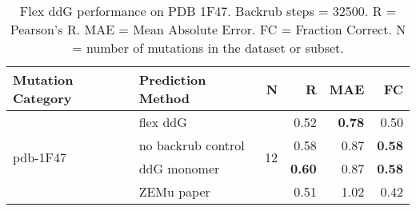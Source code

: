 \begin{table}
  \begin{tabular}{llrrrr}
\toprule
Mutation Category &   Prediction Method &   N &    R &  MAE &   FC \\
\midrule
 \multirow{ 4}{*}{pdb-1F47} & flex ddG & \multirow{ 4}{*}{12} & 0.52 & \textbf{0.78} & 0.50  \\
 & no backrub control & & 0.58 & 0.87 & \textbf{0.58}  \\
 & ddG monomer & & \textbf{0.60} & 0.87 & \textbf{0.58}  \\
 & ZEMu paper & & 0.51 & 1.02 & 0.42  \\
\bottomrule
\end{tabular}
  \caption[Flex ddG performance on PDB 1F47]{
    Flex ddG performance on PDB 1F47. Backrub steps = 32500. R = Pearson's R. MAE = Mean Absolute Error. FC = Fraction Correct. N = number of mutations in the dataset or subset.
  } \label{tab:table-pdb-1F47}
\end{table}
